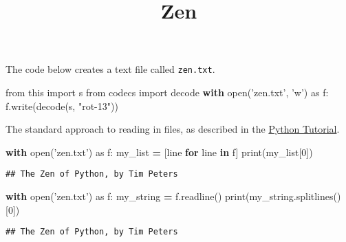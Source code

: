 \documentclass[]{article}
\title{Zen}
\author{}
\date{}
\newenvironment{Shaded}{\begin{snugshade}}{\end{snugshade}}
\newcommand{\KeywordTok}[1]{\textcolor[rgb]{0.13,0.29,0.53}{\textbf{#1}}}
\newcommand{\DecValTok}[1]{\textcolor[rgb]{0.00,0.00,0.81}{#1}}
\newcommand{\StringTok}[1]{\textcolor[rgb]{0.31,0.60,0.02}{#1}}
\newcommand{\ImportTok}[1]{#1}
\newcommand{\ControlFlowTok}[1]{\textcolor[rgb]{0.13,0.29,0.53}{\textbf{#1}}}
\newcommand{\OperatorTok}[1]{\textcolor[rgb]{0.81,0.36,0.00}{\textbf{#1}}}
\newcommand{\BuiltInTok}[1]{#1}
\newcommand{\NormalTok}[1]{#1}
\begin{document}
\maketitle

The code below creates a text file called \texttt{zen.txt}.

\begin{Shaded}
\begin{Highlighting}[]
\ImportTok{from}\NormalTok{ this }\ImportTok{import}\NormalTok{ s}
\ImportTok{from}\NormalTok{ codecs }\ImportTok{import}\NormalTok{ decode}
\ControlFlowTok{with} \BuiltInTok{open}\NormalTok{(}\StringTok{'zen.txt'}\NormalTok{, }\StringTok{'w'}\NormalTok{) }\ImportTok{as}\NormalTok{ f:}
\NormalTok{    f.write(decode(s, }\StringTok{"rot-13"}\NormalTok{))}
\end{Highlighting}
\end{Shaded}

The standard approach to reading in files, as described in the
\href{https://docs.python.org/3/tutorial/inputoutput.html\#reading-and-writing-files}{Python
Tutorial}.

\begin{Shaded}
\begin{Highlighting}[]
\ControlFlowTok{with} \BuiltInTok{open}\NormalTok{(}\StringTok{'zen.txt'}\NormalTok{) }\ImportTok{as}\NormalTok{ f:}
\NormalTok{    my_list }\OperatorTok{=}\NormalTok{ [line }\ControlFlowTok{for}\NormalTok{ line }\KeywordTok{in}\NormalTok{ f]}
\BuiltInTok{print}\NormalTok{(my_list[}\DecValTok{0}\NormalTok{])}
\end{Highlighting}
\end{Shaded}

\begin{verbatim}
## The Zen of Python, by Tim Peters
\end{verbatim}

\begin{Shaded}
\begin{Highlighting}[]
\ControlFlowTok{with} \BuiltInTok{open}\NormalTok{(}\StringTok{'zen.txt'}\NormalTok{) }\ImportTok{as}\NormalTok{ f:}
\NormalTok{    my_string }\OperatorTok{=}\NormalTok{ f.readline()}
\BuiltInTok{print}\NormalTok{(my_string.splitlines()[}\DecValTok{0}\NormalTok{])}
\end{Highlighting}
\end{Shaded}

\begin{verbatim}
## The Zen of Python, by Tim Peters
\end{verbatim}
\end{document}
